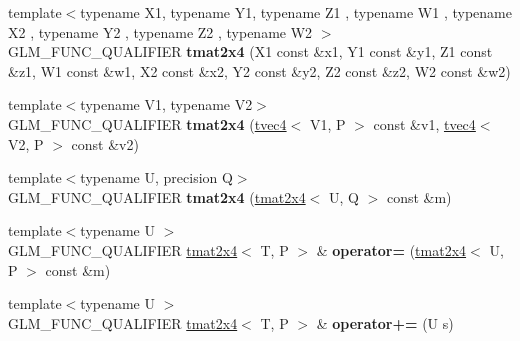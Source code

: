 \begin{DoxyCompactItemize}
\item 
{\footnotesize template$<$typename X1, typename Y1, typename Z1 , typename W1 , typename X2 , typename Y2 , typename Z2 , typename W2 $>$ }\\G\+L\+M\+\_\+\+F\+U\+N\+C\+\_\+\+Q\+U\+A\+L\+I\+F\+I\+ER {\bfseries tmat2x4} (X1 const \&x1, Y1 const \&y1, Z1 const \&z1, W1 const \&w1, X2 const \&x2, Y2 const \&y2, Z2 const \&z2, W2 const \&w2)\hypertarget{structglm_1_1detail_1_1tmat2x4_ad19123b26d51d5e015a0667d9dea5ae9}{}\label{structglm_1_1detail_1_1tmat2x4_ad19123b26d51d5e015a0667d9dea5ae9}

\item 
{\footnotesize template$<$typename V1, typename V2$>$ }\\G\+L\+M\+\_\+\+F\+U\+N\+C\+\_\+\+Q\+U\+A\+L\+I\+F\+I\+ER {\bfseries tmat2x4} (\hyperlink{structglm_1_1detail_1_1tvec4}{tvec4}$<$ V1, P $>$ const \&v1, \hyperlink{structglm_1_1detail_1_1tvec4}{tvec4}$<$ V2, P $>$ const \&v2)\hypertarget{structglm_1_1detail_1_1tmat2x4_a153edc0a905dc1128b78120c22a27b02}{}\label{structglm_1_1detail_1_1tmat2x4_a153edc0a905dc1128b78120c22a27b02}

\item 
{\footnotesize template$<$typename U, precision Q$>$ }\\G\+L\+M\+\_\+\+F\+U\+N\+C\+\_\+\+Q\+U\+A\+L\+I\+F\+I\+ER {\bfseries tmat2x4} (\hyperlink{structglm_1_1detail_1_1tmat2x4}{tmat2x4}$<$ U, Q $>$ const \&m)\hypertarget{structglm_1_1detail_1_1tmat2x4_afdac996e0de8c8beee66facceed41f53}{}\label{structglm_1_1detail_1_1tmat2x4_afdac996e0de8c8beee66facceed41f53}

\item 
{\footnotesize template$<$typename U $>$ }\\G\+L\+M\+\_\+\+F\+U\+N\+C\+\_\+\+Q\+U\+A\+L\+I\+F\+I\+ER \hyperlink{structglm_1_1detail_1_1tmat2x4}{tmat2x4}$<$ T, P $>$ \& {\bfseries operator=} (\hyperlink{structglm_1_1detail_1_1tmat2x4}{tmat2x4}$<$ U, P $>$ const \&m)\hypertarget{structglm_1_1detail_1_1tmat2x4_a05368bd4ad581b0e7d000b051f71bae5}{}\label{structglm_1_1detail_1_1tmat2x4_a05368bd4ad581b0e7d000b051f71bae5}

\item 
{\footnotesize template$<$typename U $>$ }\\G\+L\+M\+\_\+\+F\+U\+N\+C\+\_\+\+Q\+U\+A\+L\+I\+F\+I\+ER \hyperlink{structglm_1_1detail_1_1tmat2x4}{tmat2x4}$<$ T, P $>$ \& {\bfseries operator+=} (U s)\hypertarget{structglm_1_1detail_1_1tmat2x4_a4580596394e88effd02a0ea4f0b1f3a4}{}\label{structglm_1_1detail_1_1tmat2x4_a4580596394e88effd02a0ea4f0b1f3a4}


\end{DoxyCompactItemize}
